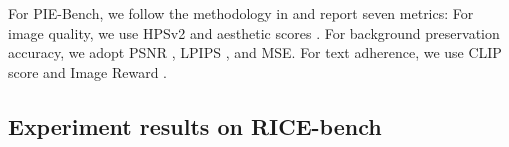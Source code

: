 \documentclass{article}
\begin{document}


For PIE-Bench, we follow the methodology in \cite{zhu2025kv} and report seven metrics: For image quality, we use HPSv2 \citep{wu2023human} and aesthetic scores \citep{schuhmann2022laionb}. For background preservation accuracy, we adopt PSNR \citep{huynh2008scope}, LPIPS \citep{zhang2018perceptual}, and MSE. For text adherence, we use CLIP score \citep{radford2021learning} and Image Reward \citep{xu2023imagereward}.

\subsection{Experiment results on RICE-bench}
\end{document}
